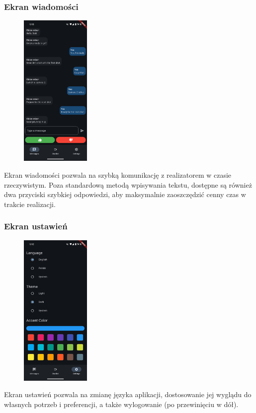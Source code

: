 \documentclass[11pt, letterpaper]{article}
\begin{document}
\subsubsection{Ekran wiadomości}
\begin{figure}[H]
    \centering
    \includegraphics[width=0.3\textwidth]{messages.png}
\end{figure}
Ekran wiadomości pozwala na szybką komunikację z realizatorem w czasie rzeczywistym. Poza standardową metodą wpisywania tekstu, dostępne są również dwa przyciski szybkiej odpowiedzi, aby maksymalnie zaoszczędzić cenny czas w trakcie realizacji.

\subsubsection{Ekran ustawień}
\begin{figure}[H]
    \centering
    \includegraphics[width=0.3\textwidth]{settings.png}
\end{figure}
Ekran ustawień pozwala na zmianę języka aplikacji, dostosowanie jej wyglądu do własnych potrzeb i preferencji, a także wylogowanie (po przewinięciu w dół).
\end{document}
